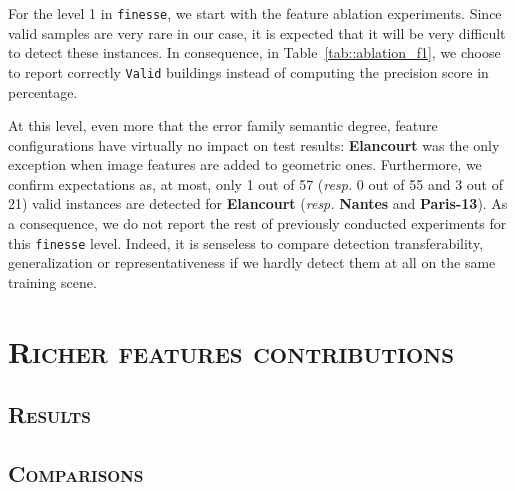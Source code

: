         For the level 1 in \texttt{finesse}, we start with the feature ablation experiments.
        Since valid samples are very rare in our case, it is expected that it will be very difficult to detect these instances.
        In consequence, in Table~\ref{tab::ablation_f1}, we choose to report correctly \texttt{Valid} buildings instead of computing the precision score in percentage.
            
        At this level, even more that the error family semantic degree, feature configurations have virtually no impact on test results: \textbf{Elancourt} was the only exception when image features are added to geometric ones.
        Furthermore, we confirm expectations as, at most, only 1 out of 57 (\textit{resp.} 0 out of 55 and 3 out of 21) valid instances are detected for \textbf{Elancourt} (\textit{resp.} \textbf{Nantes} and \textbf{Paris-13}).
        As a consequence, we do not report the rest of previously conducted experiments for this \texttt{finesse} level.
        Indeed, it is senseless to compare detection transferability, generalization or representativeness if we hardly detect them at all on the same training scene.

\section{\textsc{Richer features contributions}}
    \subsection{\textsc{Results}}
    \subsection{\textsc{Comparisons}}
